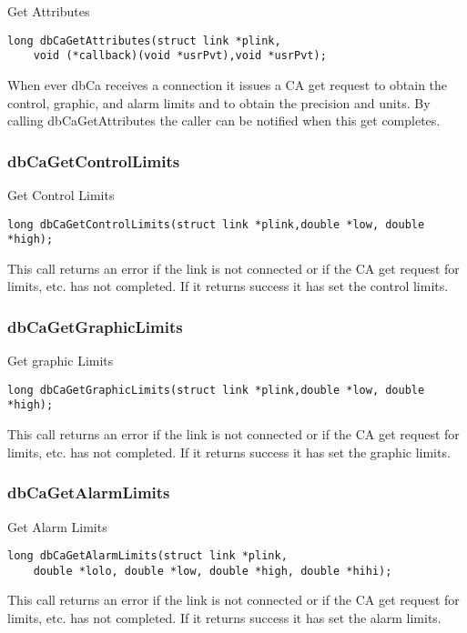 Get Attributes

\begin{verbatim}long dbCaGetAttributes(struct link *plink,
    void (*callback)(void *usrPvt),void *usrPvt);
\end{verbatim}When ever dbCa receives a connection it issues a CA get request to obtain the control, graphic, and alarm limits and to 
obtain the precision and units. By calling dbCaGetAttributes the caller can be notified when this get completes.

\subsubsection{dbCaGetControlLimits}

Get Control Limits

\begin{verbatim}long dbCaGetControlLimits(struct link *plink,double *low, double *high);
\end{verbatim}This call returns an error if the link is not connected or if the CA get request for limits, etc. has not completed. If it returns 
success it has set the control limits.

\subsubsection{dbCaGetGraphicLimits}

Get graphic Limits

\begin{verbatim}long dbCaGetGraphicLimits(struct link *plink,double *low, double *high);
\end{verbatim}This call returns an error if the link is not connected or if the CA get request for limits, etc. has not completed. If it returns 
success it has set the graphic limits.

\subsubsection{dbCaGetAlarmLimits}

Get Alarm Limits

\begin{verbatim}long dbCaGetAlarmLimits(struct link *plink,
    double *lolo, double *low, double *high, double *hihi);
\end{verbatim}This call returns an error if the link is not connected or if the CA get request for limits, etc. has not completed. If it returns 
success it has set the alarm limits.

